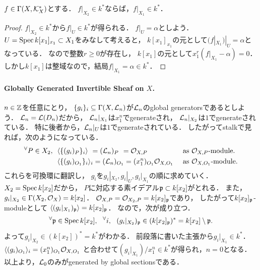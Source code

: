 \documentclass[a4paper]{jsarticle}
\begin{document}
    \begin{Claim}
        $f \in \Gamma(X, \mathcal{K}_X^*)$とする．
        $f|_{X_2} \in k^*$ならば，$f|_{X_1} \in k^*$．
    \end{Claim}
    \begin{proof}
        $f|_{X_2} \in k^*$から$f|_U \in k^*$が得られる．
        $f|_U=\alpha$としよう．
        $U=\operatorname{Spec} k[x_1]_{x_1} \subset X_1$をみなして考えると，
        $k[x_1]_{x_1}$の元として$(f|_{X_1})|_U=\alpha$となっている．
        なので整数$r \geq 0$が存在し，
        $k[x_1]$の元として$x_1^r(f|_{X_1}-\alpha)=0$．
        しかし$k[x_1]$は整域なので，結局$f|_{X_1}=\alpha \in k^*$．
    \end{proof}

    \paragraph{Globally Generated Invertible Sheaf on $X$.}
    $n \in \mathbb{Z}$を任意にとり，
    $\{g_i\}_i \subseteq \Gamma(X, \mathcal{L}_n)$が$\mathcal{L}_n$のglobal generatorsであるとしよう．
    $\mathcal{L}_n=\mathcal{L}(D_n)$だから，
    $\mathcal{L}_n|_{X_1}$は$x_1^n$でgenerateされ，
    $\mathcal{L}_n|_{X_2}$は$1$でgenerateされている．
    特に後者から，$\mathcal{L}_n|_{U}$は$1$でgenerateされている．
    したがってstalkで見れば，次のようになっている．
    \begin{align*}
        {}^{\forall} P \in X_2,~~
        &\langle \{(g_i)_{P}\}_i \rangle
            \hspace{3.5pt}
            =(\mathcal{L}_n)_{P}
            \hspace{3.7pt}
                =\mathcal{O}_{X, P}
                    &&\text{  as  $\mathcal{O}_{X, P}$-module.} \\
        &\langle \{(g_i)_{O_1}\}_i \rangle_i
            =(\mathcal{L}_n)_{O_1}
                =(x_1^n)_{O_1} \mathcal{O}_{X, O_1}
                    &&\text{  as  $\mathcal{O}_{X, O_1}$-module.}
    \end{align*}
    これらを可換環に翻訳し，
    $g_i$を$g_i|_{X_2}, g_i|_U, g_i|_{X_1}$の順に求めていく．
    $X_2=\operatorname{Spec} k[x_2]$だから，
    $P$に対応する素イデアル$\mathfrak{p} \subset k[x_2]$がとれる．
    また，$g_i|_{X_2} \in \Gamma(X_2, \mathcal{O}_X)=k[x_2]$．
    $\mathcal{O}_{X,P}=\mathcal{O}_{X_2, P}=k[x_2]_{\mathfrak{p}}$であり，
    したがって$k[x_2]_{\mathfrak{p}}$-moduleとして
    $\langle (g_i|_{X_1})_{\mathfrak{p}} \rangle=k[x_2]_{\mathfrak{p}}$．
    なので，次が成り立つ．
    \[
        {}^{\forall} \mathfrak{p} \in \operatorname{Spec} k[x_2],~~ {}^{\forall} i,~~
        (g_i|_{X_2})_{\mathfrak{p}} \in (k[x_2]_{\mathfrak{p}})^*=k[x_2] \setminus \mathfrak{p}.
    \]
    よって$g_i|_{X_2} \in (k[x_2])^*=k^*$がわかる．
    前段落に書いた主張から$g_i|_{X_1} \in k^*$．
    $\langle (g_i)_{O_1} \rangle_i=(x_1^n)_{O_1} \mathcal{O}_{X, O_1}$
    と合わせて$(g_i|_{X_1})/x_1^{n} \in k^*$が得られ，$n=0$となる．
    以上より，$\mathcal{L}_0$のみがgenerated by global sectionsである．
\end{document}
